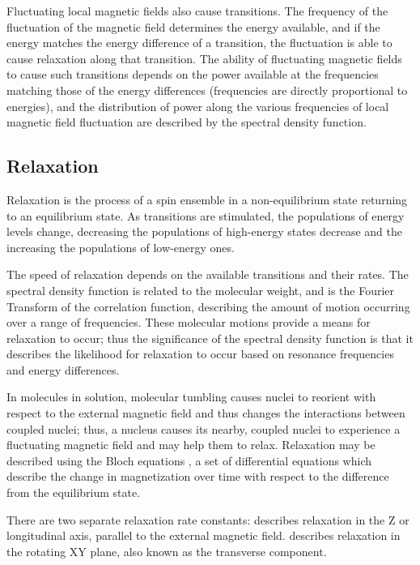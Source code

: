 Fluctuating local magnetic fields also cause transitions.  The frequency of
the fluctuation of the magnetic field determines the energy available, and if 
the energy matches the energy difference of a transition, the fluctuation is 
able to cause relaxation along that transition.  The ability of fluctuating 
magnetic fields to cause such transitions depends on the power available at the 
frequencies matching those of the energy differences (frequencies are directly
proportional to energies), and the distribution of power along the various
frequencies of local magnetic field fluctuation are described by the spectral
density function.


\subsection*{Relaxation}

Relaxation is the process of a spin ensemble in a non-equilibrium state 
returning to an equilibrium state.  As transitions are stimulated,
the populations of energy levels change, decreasing the 
populations of high-energy states decrease and the increasing the populations 
of low-energy ones.

The speed of relaxation depends on the available transitions and their rates.
The spectral density function is related to the molecular weight,
and is the Fourier Transform of the 
correlation function, describing the amount of motion occurring over a 
range of frequencies.  These molecular motions provide a means for relaxation
to occur; thus the significance of the spectral density function is
that it describes the likelihood for relaxation to occur based on resonance
frequencies and energy differences.

In molecules in solution, molecular tumbling causes nuclei to reorient with
respect to the external magnetic field and thus changes the interactions
between coupled nuclei; thus, a nucleus causes its nearby, coupled nuclei to
experience a fluctuating magnetic field and may help them to relax.
Relaxation may be described using the Bloch equations \cite{bloch1946nuclear},
a set of differential equations which describe the change in magnetization 
over time with respect to the difference from the equilibrium state.

There are two separate relaxation rate constants: \mattftone{} describes 
relaxation in the Z or longitudinal axis, parallel to the external magnetic
field.  \mattfttwo{} describes relaxation in the rotating XY plane, also known
as the transverse component.


